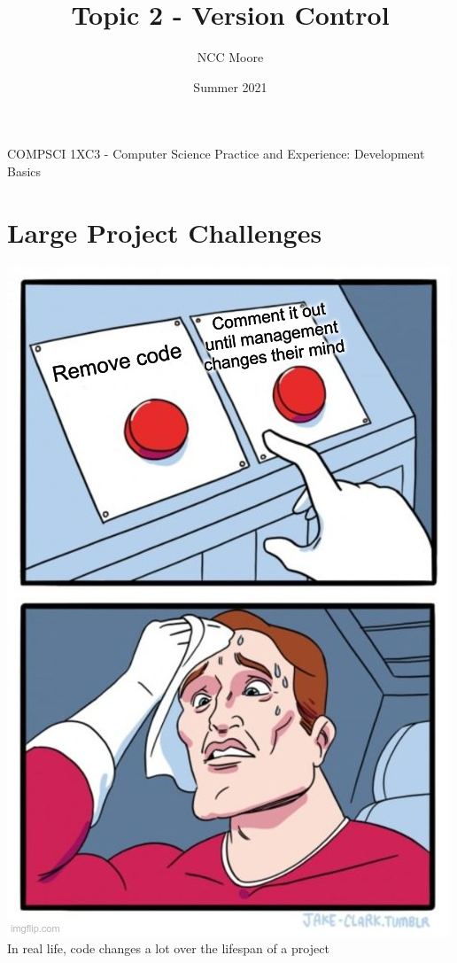 \documentclass[11pt]{beamer}
\author{NCC Moore}
\title{Topic 2 - Version Control}
\institute{McMaster University}
\date{Summer 2021}
\begin{document}
\begin{frame}
\center
COMPSCI 1XC3 - Computer Science Practice and Experience:
Development Basics
\titlepage
\end{frame}

\begin{frame}
\tableofcontents
\end{frame}

\section[Motivation]{Large Project Challenges}
\begin{frame}
\center
\includegraphics[scale=0.24]{meme3.jpeg} \\
In real life, code changes a lot over the lifespan of a project
\end{frame}
\end{document}
